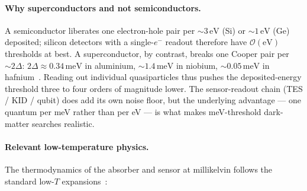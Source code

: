\paragraph{Why superconductors and not semiconductors.}
A semiconductor liberates one electron-hole pair per
$\sim 3\,\text{eV}$ (Si) or $\sim 1\,\text{eV}$ (Ge) deposited;
silicon detectors with a single-$e^{-}$ readout therefore have
$\mathcal O(\text{eV})$ thresholds at best.  A superconductor, by
contrast, breaks one Cooper pair per $\sim 2\Delta$:
$2\Delta\approx 0.34\,\text{meV}$ in aluminium, $\sim 1.4\,\text{meV}$
in niobium, $\sim 0.05\,\text{meV}$ in hafnium~\cite{tinkham2004,bcs1957}.
Reading out individual quasiparticles thus pushes the deposited-energy
threshold three to four orders of magnitude lower. The
sensor-readout chain (TES / KID / qubit) does add its own noise
floor, but the underlying advantage --- one quantum per meV rather
than per eV --- is what makes meV-threshold dark-matter searches
realistic.

\paragraph{Relevant low-temperature physics.}
The thermodynamics of the absorber and sensor at millikelvin
follows the standard low-$T$ expansions~\cite{tinkham2004}:

